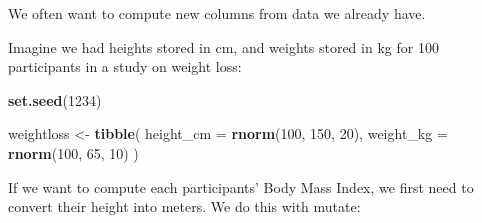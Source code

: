 \documentclass[]{article}
\newenvironment{Shaded}{\begin{snugshade}}{\end{snugshade}}
\newcommand{\CommentTok}[1]{\textcolor[rgb]{0.56,0.35,0.01}{\textit{#1}}}
\newcommand{\DataTypeTok}[1]{\textcolor[rgb]{0.13,0.29,0.53}{#1}}
\newcommand{\DecValTok}[1]{\textcolor[rgb]{0.00,0.00,0.81}{#1}}
\newcommand{\ErrorTok}[1]{\textcolor[rgb]{0.64,0.00,0.00}{\textbf{#1}}}
\newcommand{\FloatTok}[1]{\textcolor[rgb]{0.00,0.00,0.81}{#1}}
\newcommand{\KeywordTok}[1]{\textcolor[rgb]{0.13,0.29,0.53}{\textbf{#1}}}
\newcommand{\NormalTok}[1]{#1}
\newcommand{\OperatorTok}[1]{\textcolor[rgb]{0.81,0.36,0.00}{\textbf{#1}}}
\newcommand{\StringTok}[1]{\textcolor[rgb]{0.31,0.60,0.02}{#1}}
\begin{document}
We often want to compute new columns from data we already have.

Imagine we had heights stored in cm, and weights stored in kg for 100
participants in a study on weight loss:

\begin{Shaded}
\begin{Highlighting}[]
\KeywordTok{set.seed}\NormalTok{(}\DecValTok{1234}\NormalTok{)}

\NormalTok{weightloss <-}\StringTok{ }\KeywordTok{tibble}\NormalTok{(}
    \DataTypeTok{height_cm =} \KeywordTok{rnorm}\NormalTok{(}\DecValTok{100}\NormalTok{, }\DecValTok{150}\NormalTok{, }\DecValTok{20}\NormalTok{),}
    \DataTypeTok{weight_kg =} \KeywordTok{rnorm}\NormalTok{(}\DecValTok{100}\NormalTok{, }\DecValTok{65}\NormalTok{, }\DecValTok{10}\NormalTok{)}
\NormalTok{)}
\end{Highlighting}
\end{Shaded}

\begin{Shaded}
\end{Shaded}

If we want to compute each participants' Body Mass Index, we first need to
convert their height into meters. We do this with mutate:

\begin{Shaded}
\end{Shaded}
\end{document}
